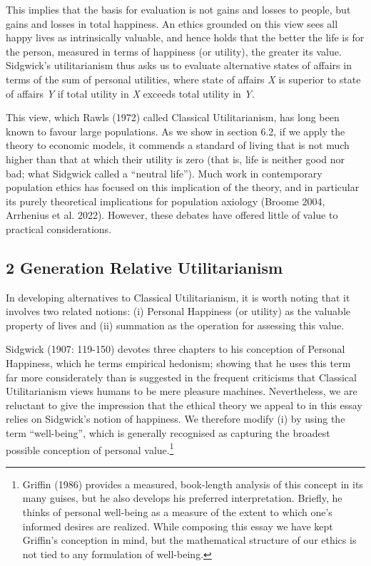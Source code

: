 \documentclass[man,11pt,a4paper,floatsintext]{apa7}
\begin{document}
This implies that the basis for evaluation is not gains and losses to people, but gains and losses in total happiness. An ethics grounded on this view sees all happy lives as intrinsically valuable, and hence holds that the better the life is for the person, measured in terms of happiness (or utility), the greater its value. Sidgwick's utilitarianism thus asks us to evaluate alternative states of affairs in terms of the sum of personal utilities, where state of affairs \textit{X} is superior to state of affairs \textit{Y} if total utility in \textit{X} exceeds total utility in \textit{Y}.

This view, which Rawls (1972) called Classical Utilitarianism, has long been known to favour large populations. As we show in section 6.2, if we apply the theory to economic models, it commends a standard of living that is not much higher than that at which their utility is zero (that is, life is neither good nor bad; what Sidgwick called a ``neutral life''). Much work in contemporary population ethics has focused on this implication of the theory, and in particular its purely theoretical implications for population axiology (Broome 2004, Arrhenius et al. 2022). However, these debates have offered little of value to practical considerations.

\subsection{2 Generation Relative Utilitarianism}

In developing alternatives to Classical Utilitarianism, it is worth noting that it involves two related notions: (i) Personal Happiness (or utility) as the valuable property of lives and (ii) summation as the operation for assessing this value.

Sidgwick (1907: 119-150) devotes three chapters to his conception of Personal Happiness, which he terms empirical hedonism; showing that he uses this term far more considerately than is suggested in the frequent criticisms that Classical Utilitarianism views humans to be mere pleasure machines. Nevertheless, we are reluctant to give the impression that the ethical theory we appeal to in this essay relies on Sidgwick's notion of happiness. We therefore modify (i) by using the term ``well-being'', which is generally recognised as capturing the broadest possible conception of personal value.\footnote{Griffin (1986) provides a measured, book-length analysis of this concept in its many guises, but he also develops his preferred interpretation. Briefly, he thinks of personal well-being as a measure of the extent to which one's informed desires are realized. While composing this essay we have kept Griffin's conception in mind, but the mathematical structure of our ethics is not tied to any formulation of well-being.}
\end{document}
